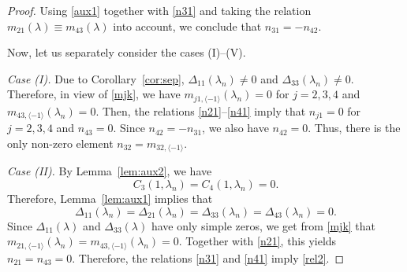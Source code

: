 \documentclass[a4paper,12pt]{article}
\newcommand{\la}{\lambda}
\theoremstyle{plain}
\numberwithin{equation}{section}
\theoremstyle{definition}
\theoremstyle{remark}
\begin{document}
\begin{proof}
Using \eqref{aux1} together with \eqref{n31} and taking the relation $m_{21}(\la) \equiv m_{43}(\la)$ into account, we conclude that $n_{31} = -n_{42}$.

Now, let us separately consider the cases (I)--(V).

\smallskip

\textit{Case (I).} Due to Corollary~\ref{cor:sep}, $\Delta_{11}(\la_n) \ne 0$ and $\Delta_{33}(\la_n) \ne 0$. Therefore, in view of \eqref{mjk}, we have $m_{j1, \langle -1 \rangle}(\la_n) = 0$ for $j = 2, 3, 4$ and $m_{43, \langle -1 \rangle}(\la_n) = 0$. Then, the relations \eqref{n21}--\eqref{n41} imply that $n_{j1} = 0$ for $j = 2, 3, 4$ and $n_{43} = 0$. Since $n_{42} = -n_{31}$, we also have $n_{42} = 0$. Thus, there is the only non-zero element $n_{32} = m_{32,\langle -1 \rangle}$.

\smallskip

\textit{Case (II).} By Lemma~\ref{lem:aux2}, we have 
\begin{equation} \label{sm2}
C_3(1,\la_n) = C_4(1,\la_n) = 0. 
\end{equation}
Therefore, Lemma~\ref{lem:aux1} implies that 
$$
\Delta_{11}(\la_n) = \Delta_{21}(\la_n) = \Delta_{33}(\la_n) = \Delta_{43}(\la_n) = 0.
$$ 
Since $\Delta_{11}(\la)$ and $\Delta_{33}(\la)$ have only simple zeros, we get from \eqref{mjk} that $m_{21,\langle -1 \rangle}(\la_n) = m_{43,\langle -1 \rangle}(\la_n) = 0$. Together with \eqref{n21}, this yields $n_{21} = n_{43} = 0$. Therefore, the relations \eqref{n31} and \eqref{n41} imply \eqref{rel2}.


\end{proof}
\end{document}
